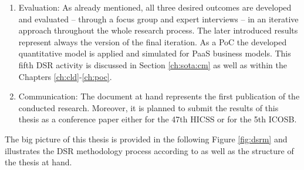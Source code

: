 \begin{enumerate}
	\item Evaluation: As already mentioned, all three desired outcomes are developed and evaluated -- through a focus group and expert interviews -- in an iterative approach throughout the whole research process. The later introduced results represent always the version of the final iteration. As a \ac{PoC} the developed quantitative model is applied and simulated for \ac{PaaS} business models. This fifth \ac{DSR} activity is discussed in Section \ref{ch:sota:cm} as well as within the Chapters \ref{ch:cld}-\ref{ch:poc}.
	\item Communication: The document at hand represents the first publication of the conducted research. Moreover, it is planned to submit the results of this thesis as a conference paper either for the 47th \ac{HICSS} or for the 5th \ac{ICOSB}.
\end{enumerate}

The big picture of this thesis is provided in the following Figure \ref{fig:dsrm} and illustrates the \ac{DSR} methodology process according to \citet{Peffers2007} as well as the structure of the thesis at hand.

\newpage


